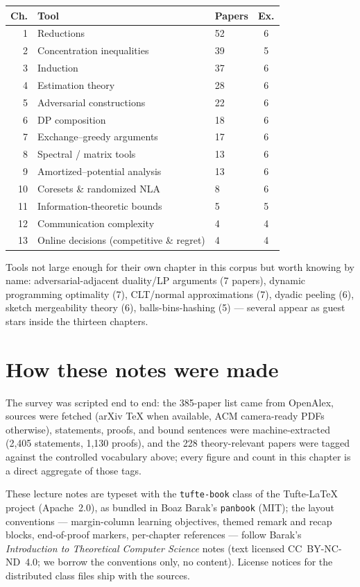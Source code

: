 \begin{widetable}[htbp]
\caption{Chapter map, ordered by how often the corpus uses each tool.
``Papers'' = tagged corpus papers using the tool; ``Ex.'' = exemplars
featured in the chapter.}
\label{tab:map}
\begin{tabular}{rllc}
\toprule
Ch. & Tool & Papers & Ex. \\
\midrule
1 & Reductions & 52 & 6 \\
2 & Concentration inequalities & 39 & 5 \\
3 & Induction & 37 & 6 \\
4 & Estimation theory & 28 & 6 \\
5 & Adversarial constructions & 22 & 6 \\
6 & DP composition & 18 & 6 \\
7 & Exchange--greedy arguments & 17 & 6 \\
8 & Spectral / matrix tools & 13 & 6 \\
9 & Amortized--potential analysis & 13 & 6 \\
10 & Coresets \& randomized NLA & 8 & 6 \\
11 & Information-theoretic bounds & 5 & 5 \\
12 & Communication complexity & 4 & 4 \\
13 & Online decisions (competitive \& regret) & 4 & 4 \\
\bottomrule
\end{tabular}
\end{widetable}

Tools not large enough for their own chapter in this corpus but worth knowing by name:
adversarial-adjacent duality/LP arguments (7 papers), dynamic programming optimality (7),
CLT/normal approximations (7), dyadic peeling (6), sketch mergeability theory (6),
balls-bins-hashing (5) --- several appear as guest stars inside the thirteen chapters.

\section{How these notes were made}
\label{sec:provenance}
The survey was scripted end to end: the 385-paper list came from OpenAlex, sources were
fetched (arXiv \TeX{} when available, ACM camera-ready PDFs otherwise), statements,
proofs, and bound sentences were machine-extracted (2{,}405 statements, 1{,}130 proofs),
and the 228 theory-relevant papers were tagged against the controlled vocabulary above;
every figure and count in this chapter is a direct aggregate of those tags.

These lecture notes are typeset with the \texttt{tufte-book} class of the
Tufte-\LaTeX{} project (Apache~2.0), as bundled in Boaz Barak's \texttt{panbook}
(MIT); the layout conventions --- margin-column learning objectives, themed remark and
recap blocks, end-of-proof markers, per-chapter references --- follow Barak's
\emph{Introduction to Theoretical Computer Science} notes (text licensed
CC~BY-NC-ND~4.0; we borrow the conventions only, no content). License notices for the
distributed class files ship with the sources.
